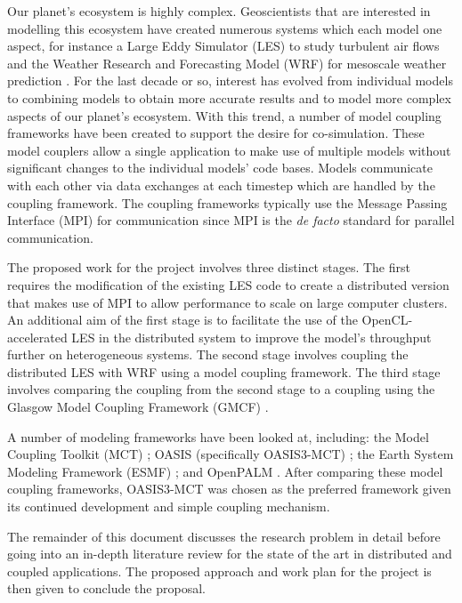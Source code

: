 Our planet's ecosystem is highly complex. Geoscientists that are interested in
modelling this ecosystem have created numerous systems which each model one
aspect, for instance a Large Eddy Simulator (LES) to study turbulent air flows
\cite{Nakayama2011,Nakayama2012} and the Weather Research and Forecasting Model
(WRF) for mesoscale weather prediction \cite{Michalakes2000}. For the last
decade or so, interest has evolved from individual models to combining models
\cite{Michalakes2010} to obtain more accurate results and to model more complex
aspects of our planet's ecosystem. With this trend, a number of model coupling
frameworks have been created to support the desire for co-simulation. These
model couplers allow a single application to make use of multiple models without
significant changes to the individual models' code bases. Models communicate
with each other via data exchanges at each timestep which are handled by the
coupling framework. The coupling frameworks typically use the Message Passing
Interface (MPI) for communication since MPI is the \textit{de facto} standard
for parallel communication.

The proposed work for the project involves three distinct stages. The first
requires the modification of the existing LES code to create a distributed
version that makes use of MPI to allow performance to scale on large computer
clusters. An additional aim of the first stage is to facilitate the use of the
OpenCL-accelerated LES \cite{Vanderbauwhede2014} in the distributed system to
improve the model's throughput further on heterogeneous systems. The second
stage involves coupling the distributed LES with WRF using a model coupling
framework. The third stage involves comparing the coupling from the second stage
to a coupling using the Glasgow Model Coupling Framework (GMCF)
\cite{Vanderbauwhede2014}.

A number of modeling frameworks have been looked at, including: the Model
Coupling Toolkit (MCT) \cite{Larson2005,Jacob2005}; OASIS (specifically
OASIS3-MCT) \cite{Valcke,Valcke2013}; the Earth System Modeling Framework (ESMF)
\cite{Ramework2004}; and OpenPALM \cite{Piacentini2011}. After comparing these
model coupling frameworks, OASIS3-MCT was chosen as the preferred framework
given its continued development and simple coupling mechanism.

The remainder of this document discusses the research problem in detail before
going into an in-depth literature review for the state of the art in distributed
and coupled applications. The proposed approach and work plan for the project is
then given to conclude the proposal.
